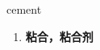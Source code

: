 
\begin{frame}
{\huge cement}
\begin{center}
\begin{enumerate}\Large
  \item \textbf{粘合，粘合剂}
\end{enumerate}
\end{center}
\end{frame}
